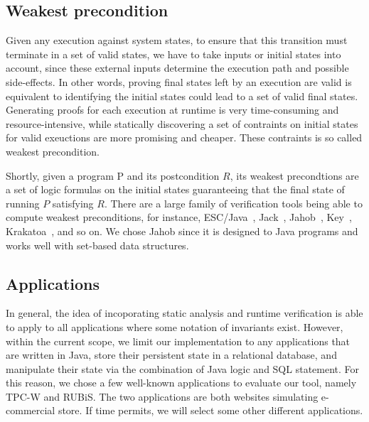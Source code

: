 \subsection{Weakest precondition}
Given any execution against system states, to ensure that this transition must
terminate in a set of valid states, we have to take inputs or initial states into
account, since these external inputs determine the execution path and possible side-effects.
In other words, proving final states left by an execution are valid is equivalent to 
identifying the initial states could lead to a set of valid final states. Generating
proofs for each execution at runtime is very time-consuming and resource-intensive, while
statically discovering a set of contraints on initial states for valid exeuctions are
more promising and cheaper. These contraints is so called weakest precondition.

Shortly, given a program {P} and its postcondition $R$, its weakest precondtions are 
a set of logic formulas on the initial states guaranteeing that the final state of running
$P$ satisfying $R$. There are a large family of verification tools being able to
compute weakest preconditions, for instance, ESC/Java~\cite{Flanagan2002ESC}, Jack~\cite{Barthe2007JACK}, 
Jahob~\cite{Kuncak2007Jahob}, Key~\cite{KeYBook2007}, Krakatoa~\cite{filliatre07cav}, and so on.
We chose Jahob since it is designed to Java programs and works well with set-based 
data structures.


\subsection{Applications}
In general, the idea of incoporating static analysis and runtime verification
is able to apply to all applications where some notation of invariants exist. However,
within the current scope, we limit our implementation to any applications that are
written in Java, store their persistent state in a relational database, and manipulate
their state via the combination of Java logic and SQL statement. For this reason, we chose
a few well-known applications to evaluate our tool, namely TPC-W and RUBiS. The
two applications are both websites simulating e-commercial store. If time permits,
we will select some other different applications.


\fi
